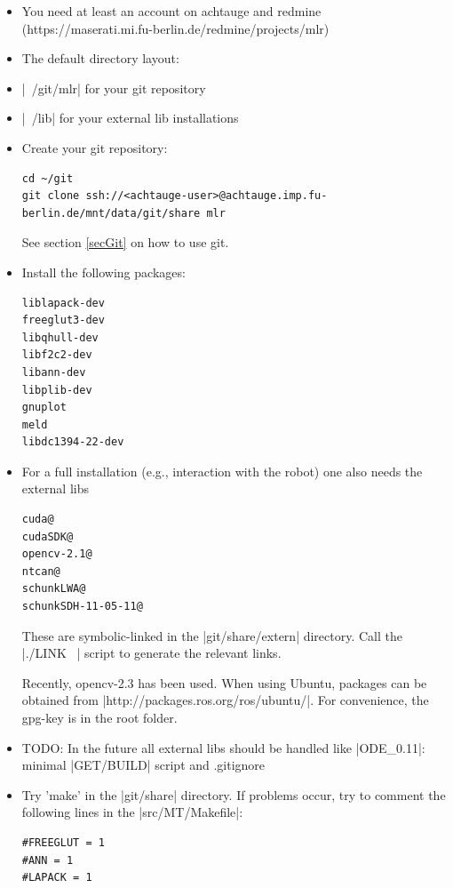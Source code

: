 \begin{itemize}
\item You need at least an account on achtauge and redmine
  (https://maserati.mi.fu-berlin.de/redmine/projects/mlr)

\item The default directory layout:
\bi
\item |~/git/mlr| for your git repository
\item |~/lib| for your external lib installations
\ei

\item Create your git repository:
\begin{code}
\begin{verbatim}
cd ~/git
git clone ssh://<achtauge-user>@achtauge.imp.fu-berlin.de/mnt/data/git/share mlr
\end{verbatim}
\end{code}
See section \ref{secGit} on how to use git.

\item Install the following packages:
\begin{code}
\begin{verbatim}
liblapack-dev
freeglut3-dev
libqhull-dev
libf2c2-dev
libann-dev
libplib-dev
gnuplot
meld
libdc1394-22-dev
\end{verbatim}
\end{code}


\item For a full installation (e.g., interaction with the robot) one also
  needs the external libs
\begin{code}
\begin{verbatim}
cuda@
cudaSDK@
opencv-2.1@
ntcan@
schunkLWA@
schunkSDH-11-05-11@ 
\end{verbatim}
\end{code}

These are symbolic-linked in the |git/share/extern| directory. Call the
  |./LINK ~\lib| script to generate the relevant links.

Recently, opencv-2.3 has been used. When using Ubuntu, packages can be 
	obtained from |http://packages.ros.org/ros/ubuntu/|. For 
	convenience, the gpg-key is in the root folder.

\item TODO: In the future all external libs should be handled like
  |ODE_0.11|: minimal |GET/BUILD| script and .gitignore

\item Try 'make' in the |git/share| directory. If problems occur, try to
comment the following lines in the |src/MT/Makefile|:
\begin{code}
\begin{verbatim}
#FREEGLUT = 1
#ANN = 1
#LAPACK = 1
\end{verbatim}
\end{code}


\end{itemize}
